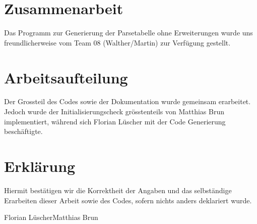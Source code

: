 \section{Zusammenarbeit}

Das Programm zur Generierung der Parsetabelle ohne Erweiterungen wurde uns freundlicherweise 
vom Team 08 (Walther/Martin) zur Verfügung gestellt.

\section{Arbeitsaufteilung}

Der Grossteil des Codes sowie der Dokumentation wurde gemeinsam erarbeitet. Jedoch wurde der 
Initialisierungscheck grösstenteils von Matthias Brun implementiert, während sich Florian Lüscher
mit der Code Generierung beschäftigte.

\section{Erklärung}

Hiermit bestätigen wir die Korrektheit der Angaben und das selbständige Erarbeiten dieser Arbeit
sowie des Codes, sofern nichts anders deklariert wurde.

\hspace{3cm}Florian Lüscher\hspace{5cm}Matthias Brun
\vspace{7cm}


